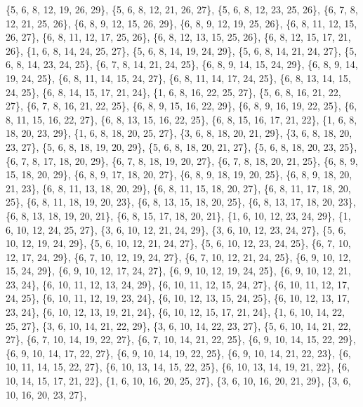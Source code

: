 \documentclass[11pt,a4paper]{article}
\begin{document}
{\{5, 6, 8, 12, 19, 26, 29\}, \{5, 6, 8, 12, 21, 26, 27\}, \{5, 6, 8, 12, 23, 25, 26\}, \{6, 7, 8, 12, 21, 25, 26\}, \{6, 8, 9, 12, 15, 26, 29\},
\{6, 8, 9, 12, 19, 25, 26\}, \{6, 8, 11, 12, 15, 26, 27\}, \{6, 8, 11, 12, 17, 25, 26\}, \{6, 8, 12, 13, 15, 25, 26\}, \{6, 8, 12, 15, 17, 21, 26\},
\{1, 6, 8, 14, 24, 25, 27\}, \{5, 6, 8, 14, 19, 24, 29\}, \{5, 6, 8, 14, 21, 24, 27\}, \{5, 6, 8, 14, 23, 24, 25\}, \{6, 7, 8, 14, 21, 24, 25\},
\{6, 8, 9, 14, 15, 24, 29\}, \{6, 8, 9, 14, 19, 24, 25\}, \{6, 8, 11, 14, 15, 24, 27\}, \{6, 8, 11, 14, 17, 24, 25\}, \{6, 8, 13, 14, 15, 24, 25\},
\{6, 8, 14, 15, 17, 21, 24\}, \{1, 6, 8, 16, 22, 25, 27\}, \{5, 6, 8, 16, 21, 22, 27\}, \{6, 7, 8, 16, 21, 22, 25\}, \{6, 8, 9, 15, 16, 22, 29\},
\{6, 8, 9, 16, 19, 22, 25\}, \{6, 8, 11, 15, 16, 22, 27\}, \{6, 8, 13, 15, 16, 22, 25\}, \{6, 8, 15, 16, 17, 21, 22\}, \{1, 6, 8, 18, 20, 23, 29\},
\{1, 6, 8, 18, 20, 25, 27\}, \{3, 6, 8, 18, 20, 21, 29\}, \{3, 6, 8, 18, 20, 23, 27\}, \{5, 6, 8, 18, 19, 20, 29\}, \{5, 6, 8, 18, 20, 21, 27\},
\{5, 6, 8, 18, 20, 23, 25\}, \{6, 7, 8, 17, 18, 20, 29\}, \{6, 7, 8, 18, 19, 20, 27\}, \{6, 7, 8, 18, 20, 21, 25\}, \{6, 8, 9, 15, 18, 20, 29\},
\{6, 8, 9, 17, 18, 20, 27\}, \{6, 8, 9, 18, 19, 20, 25\}, \{6, 8, 9, 18, 20, 21, 23\}, \{6, 8, 11, 13, 18, 20, 29\}, \{6, 8, 11, 15, 18, 20, 27\},
\{6, 8, 11, 17, 18, 20, 25\}, \{6, 8, 11, 18, 19, 20, 23\}, \{6, 8, 13, 15, 18, 20, 25\}, \{6, 8, 13, 17, 18, 20, 23\}, \{6, 8, 13, 18, 19, 20, 21\},
\{6, 8, 15, 17, 18, 20, 21\}, \{1, 6, 10, 12, 23, 24, 29\}, \{1, 6, 10, 12, 24, 25, 27\}, \{3, 6, 10, 12, 21, 24, 29\}, \{3, 6, 10, 12, 23, 24, 27\},
\{5, 6, 10, 12, 19, 24, 29\}, \{5, 6, 10, 12, 21, 24, 27\}, \{5, 6, 10, 12, 23, 24, 25\}, \{6, 7, 10, 12, 17, 24, 29\}, \{6, 7, 10, 12, 19, 24, 27\},
\{6, 7, 10, 12, 21, 24, 25\}, \{6, 9, 10, 12, 15, 24, 29\}, \{6, 9, 10, 12, 17, 24, 27\}, \{6, 9, 10, 12, 19, 24, 25\}, \{6, 9, 10, 12, 21, 23, 24\},
\{6, 10, 11, 12, 13, 24, 29\}, \{6, 10, 11, 12, 15, 24, 27\}, \{6, 10, 11, 12, 17, 24, 25\}, \{6, 10, 11, 12, 19, 23, 24\}, \{6, 10, 12, 13, 15, 24, 25\},
\{6, 10, 12, 13, 17, 23, 24\}, \{6, 10, 12, 13, 19, 21, 24\}, \{6, 10, 12, 15, 17, 21, 24\}, \{1, 6, 10, 14, 22, 25, 27\}, \{3, 6, 10, 14, 21, 22, 29\},
\{3, 6, 10, 14, 22, 23, 27\}, \{5, 6, 10, 14, 21, 22, 27\}, \{6, 7, 10, 14, 19, 22, 27\}, \{6, 7, 10, 14, 21, 22, 25\}, \{6, 9, 10, 14, 15, 22, 29\},
\{6, 9, 10, 14, 17, 22, 27\}, \{6, 9, 10, 14, 19, 22, 25\}, \{6, 9, 10, 14, 21, 22, 23\}, \{6, 10, 11, 14, 15, 22, 27\}, \{6, 10, 13, 14, 15, 22, 25\},
\{6, 10, 13, 14, 19, 21, 22\}, \{6, 10, 14, 15, 17, 21, 22\}, \{1, 6, 10, 16, 20, 25, 27\}, \{3, 6, 10, 16, 20, 21, 29\}, \{3, 6, 10, 16, 20, 23, 27\},
}
\end{document}
